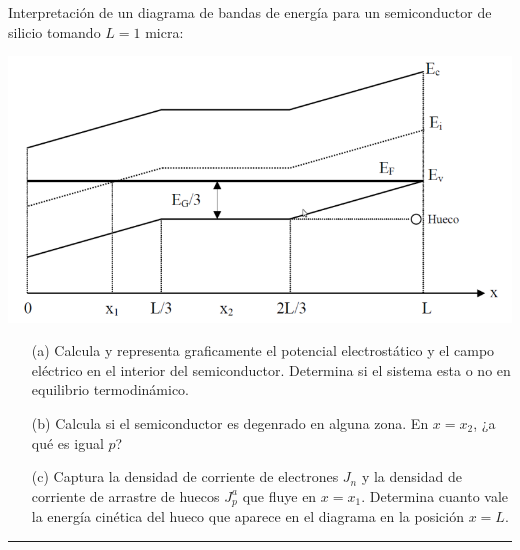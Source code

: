 Interpretación de un diagrama de bandas de energía para un semiconductor de silicio tomando $L=1$ micra:
\begin{center}
	\includegraphics[width=0.7\linewidth]{Cuerpo/Ch_02/02_Ejercicio_16.png}		
\end{center}
\begin{itemize}
	\item[(a)] Calcula y representa graficamente el potencial electrostático y el campo eléctrico en el interior del semiconductor. Determina si el sistema esta o no en equilibrio termodinámico.
	\item[(b)] Calcula si el semiconductor es degenrado en alguna zona. En $x=x_2$, ¿a qué es igual $p$?
	\item[(c)] Captura la densidad de corriente de electrones $J_n$ y la densidad de corriente de arrastre de huecos $J_p^a$ que fluye en $x=x_1$. Determina cuanto vale la energía cinética del hueco que aparece en el diagrama en la posición $x=L$. 
\end{itemize}

\rule{\textwidth}{0.1pt} \\[2pt]


